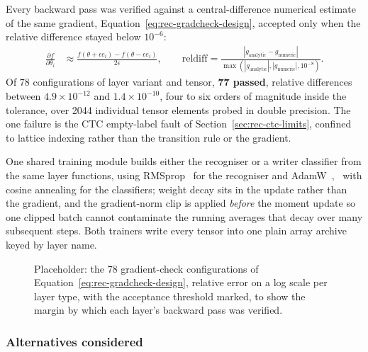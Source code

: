 Every backward pass was verified against a central-difference numerical estimate of the same gradient, Equation~\ref{eq:rec-gradcheck-design}, accepted only when the relative difference stayed below $10^{-6}$:
\begin{align}
\frac{\partial f}{\partial\theta_i}&\approx\frac{f(\theta+\epsilon e_i)-f(\theta-\epsilon e_i)}{2\epsilon},\qquad
\mathrm{reldiff}=\frac{|g_{\mathrm{analytic}}-g_{\mathrm{numeric}}|}{\max(|g_{\mathrm{analytic}}|,|g_{\mathrm{numeric}}|,10^{-8})}.\label{eq:rec-gradcheck-design}
\end{align}
Of 78 configurations of layer variant and tensor, \textbf{77 passed}, relative differences between $4.9\times10^{-12}$ and $1.4\times10^{-10}$, four to six orders of magnitude inside the tolerance, over 2044 individual tensor elements probed in double precision. The one failure is the CTC empty-label fault of Section~\ref{sec:rec-ctc-limits}, confined to lattice indexing rather than the transition rule or the gradient.

One shared training module builds either the recogniser or a writer classifier from the same layer functions, using RMSprop~\cite[Lec.~6e]{tieleman2012} for the recogniser and AdamW~\cite[Alg.~2]{loshchilov2019},~\cite[Alg.~1]{kingma2015} with cosine annealing for the classifiers; weight decay sits in the update rather than the gradient, and the gradient-norm clip is applied \emph{before} the moment update so one clipped batch cannot contaminate the running averages that decay over many subsequent steps. Both trainers write every tensor into one plain array archive keyed by layer name.

\begin{figure}[htb]
\centering
{}
\captionsetup{singlelinecheck=false,justification=justified}
\caption{Placeholder: the 78 gradient-check configurations of Equation~\ref{eq:rec-gradcheck-design}, relative error on a log scale per layer type, with the acceptance threshold marked, to show the margin by which each layer's backward pass was verified.}
\label{fig:rec-gradcheck-fig}
\end{figure}

\subsubsection{Alternatives considered}

